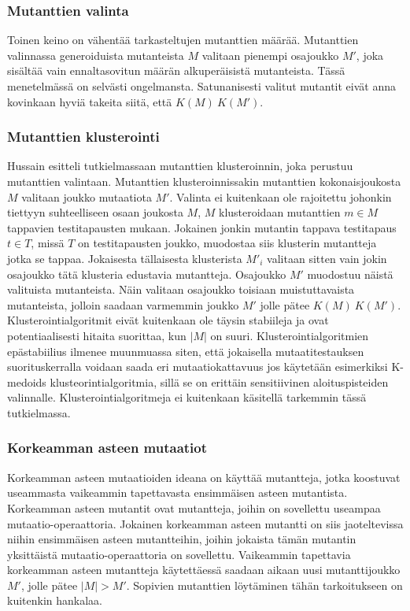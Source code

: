 \documentclass{tktltiki}
\begin{document}
\subsubsection{Mutanttien valinta}
Toinen keino on vähentää tarkasteltujen mutanttien määrää. Mutanttien valinnassa generoiduista mutanteista $M$ valitaan pienempi osajoukko $M'$, joka sisältää vain ennaltasovitun määrän alkuperäisistä mutanteista. Tässä menetelmässä on selvästi ongelmansta. Satunanisesti valitut mutantit eivät anna kovinkaan hyviä takeita siitä, että $K(M) ~ K(M')$.

\subsubsection{Mutanttien klusterointi}
Hussain esitteli tutkielmassaan mutanttien klusteroinnin, joka perustuu mutanttien valintaan. Mutanttien klusteroinnissakin mutanttien kokonaisjoukosta $M$ valitaan joukko mutaatiota $M'$. Valinta ei kuitenkaan ole rajoitettu johonkin tiettyyn suhteelliseen osaan joukosta $M$, $M$ klusteroidaan mutanttien $m\in M$ tappavien testitapausten mukaan. Jokainen jonkin mutantin tappava testitapaus $t\in T$, missä $T$ on testitapausten joukko, muodostaa siis klusterin mutantteja jotka se tappaa. Jokaisesta tällaisesta klusterista $M'_{i}$ valitaan sitten vain jokin osajoukko tätä klusteria edustavia mutantteja. Osajoukko $M'$ muodostuu näistä valituista mutanteista. Näin valitaan osajoukko toisiaan muistuttavaista mutanteista, jolloin saadaan varmemmin joukko $M'$ jolle pätee $K(M) ~ K(M')$. Klusterointialgoritmit eivät kuitenkaan ole täysin stabiileja ja ovat potentiaalisesti hitaita suorittaa, kun $|M|$ on suuri. Klusterointialgoritmien epästabiilius ilmenee muunmuassa siten, että jokaisella mutaatitestauksen suorituskerralla voidaan saada eri mutaatiokattavuus jos käytetään esimerkiksi K-medoids klusteorintialgoritmia, sillä se on erittäin sensitiivinen aloituspisteiden valinnalle. Klusterointialgoritmeja ei kuitenkaan käsitellä tarkemmin tässä tutkielmassa.

\subsubsection{Korkeamman asteen mutaatiot}
Korkeamman asteen mutaatioiden ideana on käyttää mutantteja, jotka koostuvat useammasta vaikeammin tapettavasta ensimmäisen asteen mutantista. Korkeamman asteen mutantit ovat mutantteja, joihin on sovellettu useampaa mutaatio-operaattoria. Jokainen korkeamman asteen mutantti on siis jaoteltevissa niihin ensimmäisen asteen mutantteihin, joihin jokaista tämän mutantin yksittäistä mutaatio-operaattoria on sovellettu. Vaikeammin tapettavia korkeamman asteen mutantteja käytettäessä saadaan aikaan uusi mutanttijoukko $M'$, jolle pätee $|M| > M'$. Sopivien mutanttien löytäminen tähän tarkoitukseen on kuitenkin hankalaa. 
\end{document}
